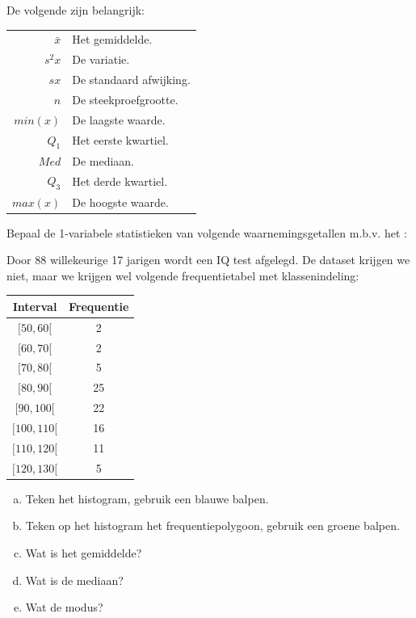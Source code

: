 \documentclass[12pt,twoside,a4paper]{article}
\begin{document}
De volgende zijn belangrijk:
\begin{center}
  \begin{tabular}{r|l}
    $\bar{x}$ & Het gemiddelde.\\
    $s^2x$ & De variatie.\\
    $sx$ & De standaard afwijking.\\
    $n$ & De steekproefgrootte.\\
    $min(x)$ & De laagste waarde.\\
    $Q_1$ & Het eerste kwartiel.\\
    $Med$ & De mediaan.\\
    $Q_3$ & Het derde kwartiel.\\
    $max(x)$ & De hoogste waarde.\\
  \end{tabular}
\end{center}

\begin{oefening}
Bepaal de 1-variabele statistieken van volgende waarnemingsgetallen m.b.v. het :
\begin{center}
\end{center}
\end{oefening}

\begin{oefening}
Door 88 willekeurige 17 jarigen wordt een IQ test afgelegd. De dataset krijgen we niet, maar we krijgen wel volgende frequentietabel met klassenindeling:
\begin{center}
  \begin{tabular}{c|c}
    Interval & Frequentie\\
    \hline
    $[50, 60[$ & 2\\
    $[60, 70[$ & 2\\
    $[70, 80[$ & 5\\
    $[80, 90[$ & 25\\
    $[90, 100[$ & 22\\
    $[100, 110[$ & 16\\
    $[110, 120[$ & 11\\
    $[120, 130[$ & 5
  \end{tabular}
\end{center}

\begin{enumerate}[(a)]
  \item Teken het histogram, gebruik een blauwe balpen.
  \item Teken op het histogram het frequentiepolygoon, gebruik een groene balpen.
  \item Wat is het gemiddelde?
  \item Wat is de mediaan?
  \item Wat de modus?
\end{enumerate}
\end{oefening}
\end{document}
